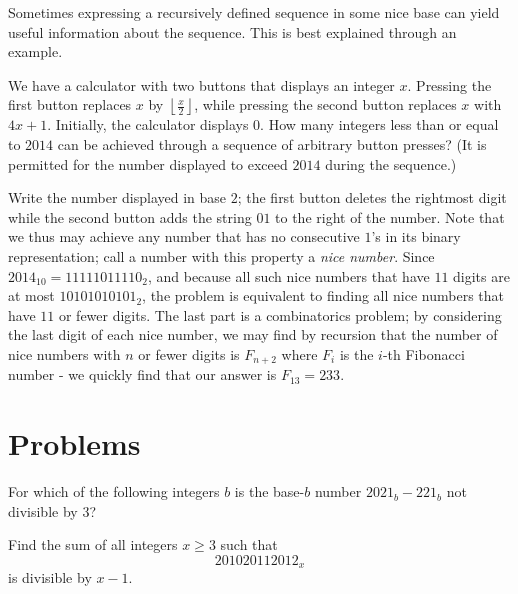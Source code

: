 \documentclass{article}
\begin{document}
Sometimes expressing a recursively defined sequence in some nice base can yield useful information about the sequence. This is best explained through an example. 

\begin{exam}
We have a calculator with two buttons that displays an integer $x$. Pressing the first button replaces $x$ by $\left\lfloor \frac x2\right\rfloor$, while pressing the second button replaces $x$ with $4x+1$. Initially, the calculator displays $0$. How many integers less than or equal to $2014$ can be achieved through a sequence of arbitrary button presses? (It is permitted for the number displayed to exceed $2014$ during the sequence.)
\end{exam}

\begin{sol}
Write the number displayed in base $2$; the first button deletes the rightmost digit while the second button adds the string $01$ to the right of the number. Note that we thus may achieve any number that has no consecutive $1$'s in its binary representation; call a number with this property a \textit{nice number}. Since $2014_{10}=11111011110_2$, and because all such nice numbers that have $11$ digits are at most $10101010101_2$, the problem is equivalent to finding all nice numbers that have $11$ or fewer digits. The last part is a combinatorics problem; by considering the last digit of each nice number, we may find by recursion that the number of nice numbers with $n$ or fewer digits is $F_{n+2}$ where $F_i$ is the $i$-th Fibonacci number - we quickly find that our answer is $F_{13}=233$. 
\end{sol}

\pagebreak

\section{Problems}



\begin{req}[AMC 10A 2021/11]{1}
For which of the following integers $b$ is the base-$b$ number $2021_b - 221_b$ not divisible by $3$?

\end{req}

\begin{prob}[SMT 2012]{2}
Find the sum of all integers $x\ge 3$ such that \[201020112012_x\] is divisible by $x-1$.
\end{prob}
\end{document}
